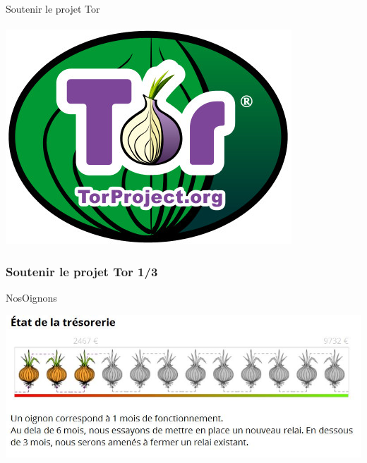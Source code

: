 \documentclass{beamer}
\begin{document}
\begin{frame}
\begin{center}
\Huge{Soutenir le projet Tor}
\\~\\ \includegraphics[scale=0.4]{./images/logo_tor.jpg}
\end{center}
\end{frame}
\begin{frame}
\frametitle{Soutenir le projet Tor 1/3}

\begin{block}{NosOignons}
\begin{itemize}
\end{itemize}
\begin{center}
\includegraphics[scale=0.6]{./images/Dons_nos_oignons.jpg}
\end{center}
\end{block}
 \end{frame}
\end{document}

